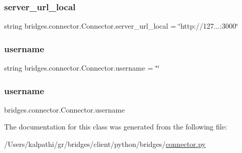 \subsubsection{\texorpdfstring{server\+\_\+url\+\_\+local}{server\_url\_local}}
{\footnotesize\ttfamily string bridges.\+connector.\+Connector.\+server\+\_\+url\+\_\+local = \char`\"{}http\+://127...\+:3000\char`\"{}\hspace{0.3cm}{\ttfamily [static]}}

\mbox{\label{classbridges_1_1connector_1_1_connector_af2f4f996092cf63a5e7940ca93a2c6b7}} 
\subsubsection{\texorpdfstring{username}{username}\hspace{0.1cm}{\footnotesize\ttfamily [1/2]}}
{\footnotesize\ttfamily string bridges.\+connector.\+Connector.\+username = \char`\"{}\char`\"{}\hspace{0.3cm}{\ttfamily [static]}}

\mbox{\label{classbridges_1_1connector_1_1_connector_adeb8d1b493eae70c24127fb175e1bfe7}} 
\subsubsection{\texorpdfstring{username}{username}\hspace{0.1cm}{\footnotesize\ttfamily [2/2]}}
{\footnotesize\ttfamily bridges.\+connector.\+Connector.\+username}



The documentation for this class was generated from the following file\+:\begin{DoxyCompactItemize}
\item 
/\+Users/kalpathi/gr/bridges/client/python/bridges/\mbox{\hyperlink{connector_8py}{connector.\+py}}\end{DoxyCompactItemize}
